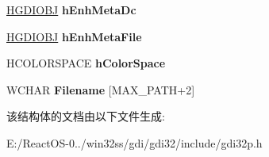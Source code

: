 \begin{DoxyCompactItemize}
\hyperlink{interfacevoid}{H\+G\+D\+I\+O\+BJ} {\bfseries h\+Enh\+Meta\+Dc}
\item 
\mbox{\label{structtag_m_e_t_a_f_i_l_e_d_c_a0df825c3e9f58dc07eaee3753a1aed29}} 
\hyperlink{interfacevoid}{H\+G\+D\+I\+O\+BJ} {\bfseries h\+Enh\+Meta\+File}
\item 
\mbox{\label{structtag_m_e_t_a_f_i_l_e_d_c_a30d97fb7b0d671bb44a78477d8817177}} 
H\+C\+O\+L\+O\+R\+S\+P\+A\+CE {\bfseries h\+Color\+Space}
\item 
\mbox{\label{structtag_m_e_t_a_f_i_l_e_d_c_a84ae68b7f5977c82c2e295557fa11712}} 
W\+C\+H\+AR {\bfseries Filename} \mbox{[}M\+A\+X\+\_\+\+P\+A\+TH+2\mbox{]}
\end{DoxyCompactItemize}


该结构体的文档由以下文件生成\+:\begin{DoxyCompactItemize}
\item 
E\+:/\+React\+O\+S-\/0../win32ss/gdi/gdi32/include/gdi32p.\+h\end{DoxyCompactItemize}
